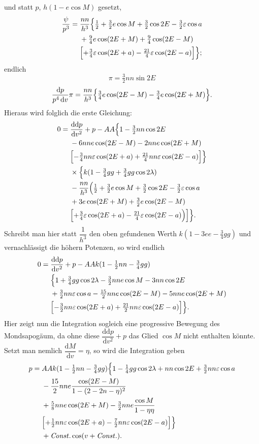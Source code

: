 \noindent und statt \(p\), \(h(1-e\cos M)\) gesetzt,
\[
\begin{aligned}
\frac{\psi}{p^3}={}&\frac{nn}{h^3}\Bigl\{\tfrac12+\tfrac32e\cos M+\tfrac32\cos2E
-\tfrac32\varepsilon\cos a\\
&+\tfrac94e\cos(2E+M)+\tfrac94\cos(2E-M)\\
&\Bigl[+\tfrac34\varepsilon\cos(2E+a)-\tfrac{21}{4}\varepsilon\cos(2E-a)\Bigr]\Bigr\};
\end{aligned}
\]
\noindent endlich
\[
\pi=\tfrac32nn\sin2E
\]
\[
\frac{\mathrm{d}p}{p^4\,\mathrm{d}v}\pi
=\frac{nn}{h^3}\Bigl\{\tfrac34e\cos(2E-M)-\tfrac34e\cos(2E+M)\Bigr\}.
\]
\noindent Hieraus wird folglich die erste Gleichung:
\[
\begin{aligned}
0={}&\frac{\mathrm{dd}p}{\mathrm{d}v^2}+p-AA\Bigl\{1-\tfrac32nn\cos2E\\
&-6nne\cos(2E-M)-2nne\cos(2E+M)\\
&\Bigl[-\tfrac34nn\varepsilon\cos(2E+a)+\tfrac{21}{4}nn\varepsilon\cos(2E-a)\Bigr]\Bigr\}\\
&\times\Bigl\{k(1-\tfrac34gg+\tfrac34gg\cos2\lambda)\\
&-\frac{nn}{h^3}\Bigl(\tfrac12+\tfrac32e\cos M+\tfrac32\cos2E
-\tfrac32\varepsilon\cos a\\
&+3e\cos(2E+M)+\tfrac32e\cos(2E-M)\\
&\Bigl[+\tfrac34\varepsilon\cos(2E+a)-\tfrac{21}{4}\varepsilon\cos(2E-a)\Bigr)\Bigr]\Bigr\}.
\end{aligned}
\]
\noindent Schreibt man hier statt \(\dfrac1{h^3}\) den oben gefundenen Werth
\(k(1-3ee-\tfrac34gg)\) und vernachlässigt die höhern Potenzen, so wird endlich
\[
\begin{aligned}
0={}&\frac{\mathrm{dd}p}{\mathrm{d}v^2}+p-AAk(1-\tfrac12nn-\tfrac34gg)\\
&\Bigl\{1+\tfrac34gg\cos2\lambda-\tfrac32nne\cos M-3nn\cos2E\\
&+\tfrac32nn\varepsilon\cos a-\tfrac{15}{2}nne\cos(2E-M)-5nne\cos(2E+M)\\
&\Bigl[-\tfrac32nn\varepsilon\cos(2E+a)+\tfrac{21}{2}nn\varepsilon\cos(2E-a)\Bigr]\Bigr\}.
\end{aligned}
\]
\noindent Hier zeigt nun die Integration sogleich eine progressive Bewegung des
Mondsapogäum, da ohne diese \(\dfrac{\mathrm{dd}p}{\mathrm{d}v^2}+p\)
das Glied \(\cos M\) nicht enthalten könnte. Setzt man nemlich
\(\dfrac{\mathrm{d}M}{\mathrm{d}v}=\eta\), so wird die Integration geben
\[
\begin{aligned}
p={}&AAk(1-\tfrac12nn-\tfrac34gg)\Bigl\{1-\tfrac14gg\cos2\lambda
+nn\cos2E+\tfrac32nn\varepsilon\cos a\\
&-\frac{15}{2}nne\frac{\cos(2E-M)}{1-(2-2n-\eta)^2}\\
&+\tfrac58nne\cos(2E+M)-\tfrac32nne\frac{\cos M}{1-\eta\eta}\\
&\Bigl[+\tfrac12nn\varepsilon\cos(2E+a)-\tfrac72nn\varepsilon\cos(2E-a)\Bigr]\Bigr\}\\
&+\mathit{Const.}\cos(v+\mathit{Const.}).
\end{aligned}
\]
\clearpage
\endgroup
